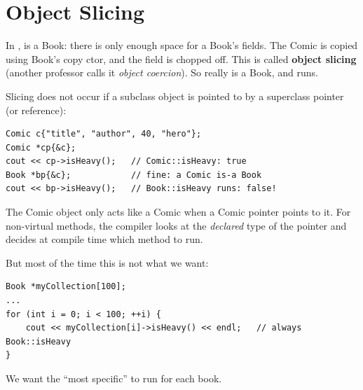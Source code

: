 \section{Object Slicing}
In ,  is a Book: there is only enough
space for a Book's fields. The Comic is copied using Book's copy ctor, and the
 field is chopped off. This is called \textbf{object slicing}
(another professor calls it \emph{object coercion}). So  really is a
Book, and  runs.
\begin{center}
\end{center}

Slicing does not occur if a subclass object is pointed to by a superclass
pointer (or reference):
\begin{lstlisting}[style=cpp]
Comic c{"title", "author", 40, "hero"};
Comic *cp{&c};
cout << cp->isHeavy();   // Comic::isHeavy: true
Book *bp{&c};            // fine: a Comic is-a Book
cout << bp->isHeavy();   // Book::isHeavy runs: false!
\end{lstlisting}
The Comic object only acts like a Comic when a Comic pointer points to it. For
non-virtual methods, the compiler looks at the \emph{declared} type of the
pointer and decides at compile time which method to run.

But most of the time this is not what we want:
\begin{lstlisting}[style=cpp]
Book *myCollection[100];
...
for (int i = 0; i < 100; ++i) {
    cout << myCollection[i]->isHeavy() << endl;   // always Book::isHeavy
}
\end{lstlisting}
We want the ``most specific''  to run for each book.

